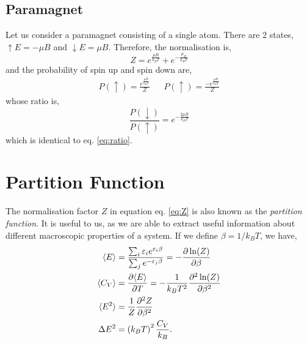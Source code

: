 \documentclass{book}
\begin{document}
\subsection{Paramagnet}
Let us consider a paramagnet consisting of a single atom. There are 2 states, $\uparrow E = -\mu B$ and $\downarrow E = \mu B$. Therefore, the normalisation is,
\begin{equation}
	Z = e^{\frac{\mu B}{k_BT}} + e^{-\frac{\mu_B}{k_BT}}
\end{equation}
and the probability of spin up and spin down are,
\begin{align}
	P(\uparrow) = \frac{e^{\frac{\mu B}{k_B T}}}{Z} && P(\uparrow) = \frac{-e^{\frac{\mu B}{k_B T}}}{Z}
\end{align}
whose ratio is,
\begin{equation}
	\frac{P(\downarrow)}{P(\uparrow)} = e^{-\frac{2\mu B}{k_BT}}
\end{equation}
which is identical to eq. \eqref{eq:ratio}.
\section{Partition Function}
The normalisation factor $Z$ in equation eq. \eqref{eq:Z} is also known as the \textit{partition function}. It is useful to us, as we are able to extract useful information about different macroscopic properties of a system. If we define $\beta = 1/k_BT$, we have,
\begin{align}
	\langle E \rangle & = \frac{\sum_i\varepsilon_ie^{\varepsilon_i\beta}}{\sum_j e^{-\varepsilon_j \beta}} = -\pdv{\ln(Z)}{\beta} \\
	\langle C_V \rangle & = \pdv{\langle E \rangle}{T} = -\frac{1}{k_BT^2}\pdv[2]{\ln(Z)}{\beta} \\
	\langle E^2 \rangle & = \frac{1}{Z}\pdv[2]{Z}{\beta}\\
	\Delta E^2 & = \left(k_B T\right)^2 \frac{C_V}{k_B}.
\end{align}
\end{document}
